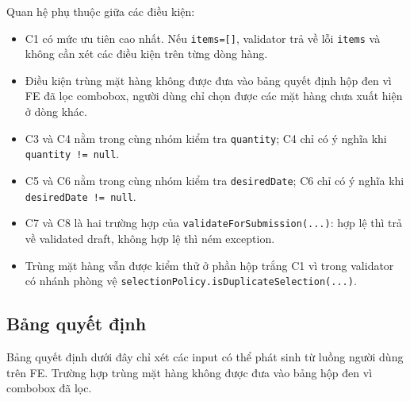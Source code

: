 \documentclass[12pt,a4paper]{article}
\newcommand{\code}[1]{\texttt{#1}}
\begin{document}
Quan hệ phụ thuộc giữa các điều kiện:
\begin{itemize}[leftmargin=1.1cm]
  \item C1 có mức ưu tiên cao nhất. Nếu \code{items=[]}, validator trả về lỗi \code{items} và không cần xét các điều kiện trên từng dòng hàng.
  \item Điều kiện trùng mặt hàng không được đưa vào bảng quyết định hộp đen vì FE đã lọc combobox, người dùng chỉ chọn được các mặt hàng chưa xuất hiện ở dòng khác.
  \item C3 và C4 nằm trong cùng nhóm kiểm tra \code{quantity}; C4 chỉ có ý nghĩa khi \code{quantity != null}.
  \item C5 và C6 nằm trong cùng nhóm kiểm tra \code{desiredDate}; C6 chỉ có ý nghĩa khi \code{desiredDate != null}.
  \item C7 và C8 là hai trường hợp của \code{validateForSubmission(...)}: hợp lệ thì trả về validated draft, không hợp lệ thì ném exception.
  \item Trùng mặt hàng vẫn được kiểm thử ở phần hộp trắng C1 vì trong validator có nhánh phòng vệ \code{selectionPolicy.isDuplicateSelection(...)}.
\end{itemize}

\subsection{Bảng quyết định}

Bảng quyết định dưới đây chỉ xét các input có thể phát sinh từ luồng người dùng trên FE. Trường hợp trùng mặt hàng không được đưa vào bảng hộp đen vì combobox đã lọc.
\end{document}
